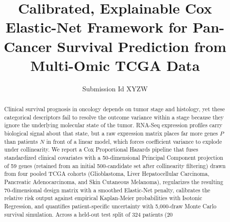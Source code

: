 \documentclass[sigconf, review=true]{acmart}
\begin{document}
\title{Calibrated, Explainable Cox Elastic-Net Framework for Pan-Cancer Survival Prediction from Multi-Omic TCGA Data}

\author{Submission Id XYZW}

\renewcommand{\shortauthors}{}

\begin{abstract}
Clinical survival prognosis in oncology depends on tumor stage and histology, yet these categorical descriptors fail to resolve the outcome variance within a stage because they ignore the underlying molecular state of the tumor. RNA-Seq expression profiles carry biological signal about that state, but a raw expression matrix places far more genes $P$ than patients $N$ in front of a linear model, which forces coefficient variance to explode under collinearity. We report a Cox Proportional Hazards pipeline that fuses standardized clinical covariates with a 50-dimensional Principal Component projection of 59 genes (retained from an initial 500-candidate set after collinearity filtering) drawn from four pooled TCGA cohorts (Glioblastoma, Liver Hepatocellular Carcinoma, Pancreatic Adenocarcinoma, and Skin Cutaneous Melanoma), regularizes the resulting 70-dimensional design matrix with a smoothed Elastic-Net penalty, calibrates the relative risk output against empirical Kaplan-Meier probabilities with Isotonic Regression, and quantifies patient-specific uncertainty with 5,000-draw Monte Carlo survival simulation. Across a held-out test split of 324 patients (20%
\end{abstract}
\end{document}
